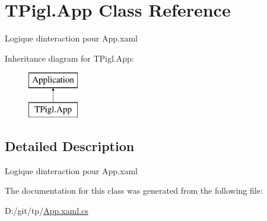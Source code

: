 \hypertarget{class_t_pigl_1_1_app}{}\section{T\+Pigl.\+App Class Reference}
\label{class_t_pigl_1_1_app}


Logique d\textquotesingle{}interaction pour App.\+xaml  


Inheritance diagram for T\+Pigl.\+App\+:\begin{figure}[H]
\begin{center}
\leavevmode
\includegraphics[height=2.000000cm]{class_t_pigl_1_1_app}
\end{center}
\end{figure}


\subsection{Detailed Description}
Logique d\textquotesingle{}interaction pour App.\+xaml 



The documentation for this class was generated from the following file\+:\begin{DoxyCompactItemize}
\item 
D\+:/git/tp/\hyperlink{_app_8xaml_8cs}{App.\+xaml.\+cs}\end{DoxyCompactItemize}
